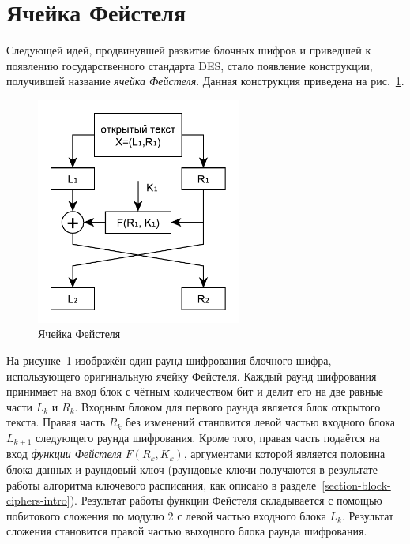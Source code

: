 \section{Ячейка Фейстеля}

Следующей идей, продвинувшей развитие блочных шифров и приведшей к появлению государственного стандарта DES, стало появление конструкции, получившей название \emph{ячейка Фейстеля}. Данная конструкция приведена на рис.~\ref{fig:Feistel}.

\begin{figure}[!htb]
    \centering
    \includegraphics[width=0.6\textwidth]{pic/feistel}
    \caption{Ячейка Фейстеля\label{fig:Feistel}}
\end{figure}

На рисунке~\ref{fig:Feistel} изображён один раунд шифрования блочного шифра, использующего оригинальную ячейку Фейстеля. Каждый раунд шифрования принимает на вход блок с чётным количеством бит и делит его на две равные части $L_k$ и $R_k$. Входным блоком для первого раунда является блок открытого текста. Правая часть $R_k$ без изменений становится левой частью входного блока $L_{k+1}$ следующего раунда шифрования. Кроме того, правая часть подаётся на вход \emph{функции Фейстеля} $F\left(R_k, K_k \right)$, аргументами которой является половина блока данных и раундовый ключ (раундовые ключи получаются в результате работы алгоритма ключевого расписания, как описано в разделе~\ref{section-block-ciphers-intro}). Результат работы функции Фейстеля складывается с помощью побитового сложения по модулю 2 с левой частью входного блока $L_k$. Результат сложения становится правой частью выходного блока раунда шифрования.

